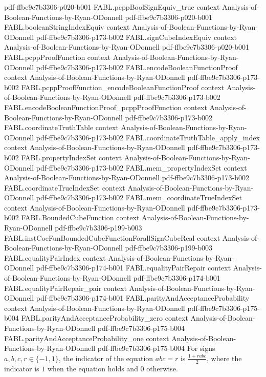 \begin{theorem}
  {pdf-ffbe9c7b3306-p020-b001}
\proofstep
  {FABL.pcppBoolSignEquiv_true}
  {context}
  {Analysis-of-Boolean-Functions-by-Ryan-ODonnell}
  {pdf-ffbe9c7b3306-p020-b001}
\proofstep
  {FABL.booleanStringIndexEquiv}
  {context}
  {Analysis-of-Boolean-Functions-by-Ryan-ODonnell}
  {pdf-ffbe9c7b3306-p173-b002}
\proofstep
  {FABL.signCubeIndexEquiv}
  {context}
  {Analysis-of-Boolean-Functions-by-Ryan-ODonnell}
  {pdf-ffbe9c7b3306-p020-b001}
\proofstep
  {FABL.pcppProofFunction}
  {context}
  {Analysis-of-Boolean-Functions-by-Ryan-ODonnell}
  {pdf-ffbe9c7b3306-p173-b002}
\proofstep
  {FABL.encodeBooleanFunctionProof}
  {context}
  {Analysis-of-Boolean-Functions-by-Ryan-ODonnell}
  {pdf-ffbe9c7b3306-p173-b002}
\proofstep
  {FABL.pcppProofFunction_encodeBooleanFunctionProof}
  {context}
  {Analysis-of-Boolean-Functions-by-Ryan-ODonnell}
  {pdf-ffbe9c7b3306-p173-b002}
\proofstep
  {FABL.encodeBooleanFunctionProof_pcppProofFunction}
  {context}
  {Analysis-of-Boolean-Functions-by-Ryan-ODonnell}
  {pdf-ffbe9c7b3306-p173-b002}
\proofstep
  {FABL.coordinateTruthTable}
  {context}
  {Analysis-of-Boolean-Functions-by-Ryan-ODonnell}
  {pdf-ffbe9c7b3306-p173-b002}
\proofstep
  {FABL.coordinateTruthTable_apply_index}
  {context}
  {Analysis-of-Boolean-Functions-by-Ryan-ODonnell}
  {pdf-ffbe9c7b3306-p173-b002}
\proofstep
  {FABL.propertyIndexSet}
  {context}
  {Analysis-of-Boolean-Functions-by-Ryan-ODonnell}
  {pdf-ffbe9c7b3306-p173-b002}
\proofstep
  {FABL.mem_propertyIndexSet}
  {context}
  {Analysis-of-Boolean-Functions-by-Ryan-ODonnell}
  {pdf-ffbe9c7b3306-p173-b002}
\proofstep
  {FABL.coordinateTrueIndexSet}
  {context}
  {Analysis-of-Boolean-Functions-by-Ryan-ODonnell}
  {pdf-ffbe9c7b3306-p173-b002}
\proofstep
  {FABL.mem_coordinateTrueIndexSet}
  {context}
  {Analysis-of-Boolean-Functions-by-Ryan-ODonnell}
  {pdf-ffbe9c7b3306-p173-b002}
\proofstep
  {FABL.BoundedCubeFunction}
  {context}
  {Analysis-of-Boolean-Functions-by-Ryan-ODonnell}
  {pdf-ffbe9c7b3306-p199-b003}
\proofstep
  {FABL.instCoeFunBoundedCubeFunctionForallSignCubeReal}
  {context}
  {Analysis-of-Boolean-Functions-by-Ryan-ODonnell}
  {pdf-ffbe9c7b3306-p199-b003}
\proofstep
  {FABL.equalityPairIndex}
  {context}
  {Analysis-of-Boolean-Functions-by-Ryan-ODonnell}
  {pdf-ffbe9c7b3306-p174-b001}
\proofstep
  {FABL.equalityPairRepair}
  {context}
  {Analysis-of-Boolean-Functions-by-Ryan-ODonnell}
  {pdf-ffbe9c7b3306-p174-b001}
\proofstep
  {FABL.equalityPairRepair_pair}
  {context}
  {Analysis-of-Boolean-Functions-by-Ryan-ODonnell}
  {pdf-ffbe9c7b3306-p174-b001}
\proofstep
  {FABL.parityAndAcceptanceProbability}
  {context}
  {Analysis-of-Boolean-Functions-by-Ryan-ODonnell}
  {pdf-ffbe9c7b3306-p175-b004}
\proofstep
  {FABL.parityAndAcceptanceProbability_zero}
  {context}
  {Analysis-of-Boolean-Functions-by-Ryan-ODonnell}
  {pdf-ffbe9c7b3306-p175-b004}
\proofstep
  {FABL.parityAndAcceptanceProbability_one}
  {context}
  {Analysis-of-Boolean-Functions-by-Ryan-ODonnell}
  {pdf-ffbe9c7b3306-p175-b004}
For signs $a,b,c,r\in\{-1,1\}$, the indicator of the equation $abc=r$ is
$\frac{1+rabc}{2}$, where the indicator is $1$ when the equation holds and $0$
otherwise.
\end{theorem}

